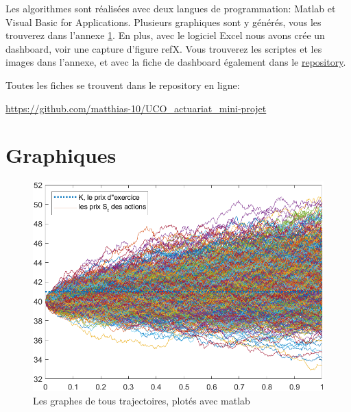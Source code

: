 \documentclass[a4paper,12pt]{scrartcl}
\begin{document}
Les algorithmes sont réalisées avec deux langues de programmation: Matlab et Visual Basic for Applications.
Plusieurs graphiques sont y générés, vous les trouverez dans l'annexe \ref{graphiques}.
En plus, avec le logiciel Excel nous avons crée un dashboard, voir une capture d'figure ref{X}. 
Vous trouverez les scriptes et les images dans l'annexe, et avec la fiche de dashboard également dans le \href{https://github.com/matthias-10/UCO_actuariat_mini-projet}{repository}.

\clearpage

\appendix
\appendixpage
\addappheadtotoc

\begin{center}
Toutes les fiches se trouvent dans le repository en ligne: 

 \url{https://github.com/matthias-10/UCO_actuariat_mini-projet}
\end{center}

\section{Graphiques} \label{graphiques}

\begin{figure}[h!]
  \begin{center}
    \includegraphics[width=14cm]{"graphiques/S.png"}
    \caption{Les graphes de tous trajectoires, plotés avec matlab}
    \label{fig:S}
  \end{center}
\end{figure}
\end{document}
